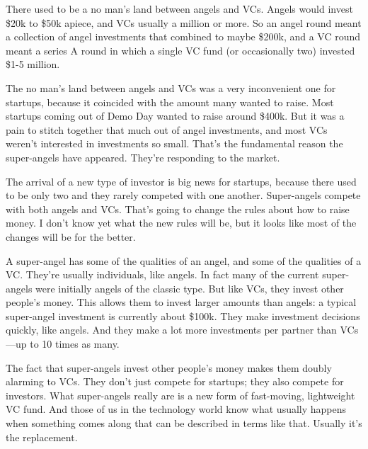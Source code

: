 There used to be a no man's land between
                    angels and VCs. Angels would invest \$20k to \$50k apiece, and
                    VCs usually a million or more. So an angel round meant a
                    collection of angel investments that combined to maybe
                    \$200k, and a VC round meant a series A round in which a
                    single VC fund (or occasionally two) invested \$1-5
                    million.

The no man's land between angels and VCs
                    was a very inconvenient one for startups, because it
                    coincided with the amount many wanted to raise. Most
                    startups coming out of Demo Day wanted to raise around
                    \$400k. But it was a pain to stitch together that much out of
                    angel investments, and most VCs weren't interested in
                    investments so small. That's the fundamental reason the
                    super-angels have appeared. They're responding to the
                    market.

The arrival of a new type of investor is
                    big news for startups, because there used to be only two and
                    they rarely competed with one another. Super-angels compete
                    with both angels and VCs. That's going to change the rules
                    about how to raise money. I don't know yet what the new
                    rules will be, but it looks like most of the changes will be
                    for the better.

A super-angel has some of the
                    qualities of an angel, and some of the qualities of a VC.
                    They're usually individuals, like angels. In fact many of
                    the current super-angels were initially angels of the
                    classic type. But like VCs, they invest other people's
                    money. This allows them to invest larger amounts than
                    angels: a typical super-angel investment is currently about
                    \$100k. They make investment decisions quickly, like angels.
                    And they make a lot more investments per partner than
                    VCs---up to 10 times as many.

The fact that
                    super-angels invest other people's money makes them doubly
                    alarming to VCs. They don't just compete for startups; they
                    also compete for investors. What super-angels really are is
                    a new form of fast-moving, lightweight VC fund. And those of
                    us in the technology world know what usually happens when
                    something comes along that can be described in terms like
                    that. Usually it's the replacement.

